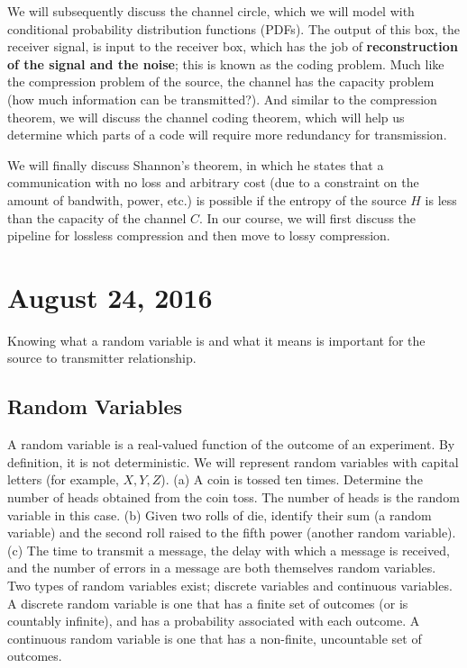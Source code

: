 \documentclass[11pt]{article}
\theoremstyle{definition}
\begin{document}
We will subsequently discuss the channel circle, which we will model with conditional probability distribution functions (PDFs). The output of this box, the receiver signal, is input to the receiver box, which has the job of \textbf{reconstruction of the signal and the noise}; this is known as the coding problem. Much like the compression problem of the source, the channel has the capacity problem (how much information can be transmitted?). And similar to the compression theorem, we will discuss the channel coding theorem, which will help us determine which parts of a code will require more redundancy for transmission. 

We will finally discuss Shannon's theorem, in which he states that a communication with no loss and arbitrary cost (due to a constraint on the amount of bandwith, power, etc.) is possible if the entropy of the source $H$ is less than the capacity of the channel $C$. In our course, we will first discuss the pipeline for lossless compression and then move to lossy compression.

\section{August 24, 2016}
Knowing what a random variable is and what it means is important for the source to transmitter relationship. 
\subsection{Random Variables}
 A random variable is a real-valued function of the outcome of an experiment. By definition, it is not deterministic.
\notation We will represent random variables with capital letters (for example, $X, Y, Z$).
 (a) A coin is tossed ten times. Determine the number of heads obtained from the coin toss. The number of heads is the random variable in this case. (b) Given two rolls of die, identify their sum (a random variable) and the second roll raised to the fifth power (another random variable). (c) The time to transmit a message, the delay with which a message is received, and the number of errors in a message are both themselves random variables. \\

\noindent Two types of random variables exist; discrete variables and continuous variables. 
 A discrete random variable is one that has a finite set of outcomes (or is countably infinite), and has a probability associated with each outcome. 
 A continuous random variable is one that has a non-finite, uncountable set of outcomes. 
\end{document}
